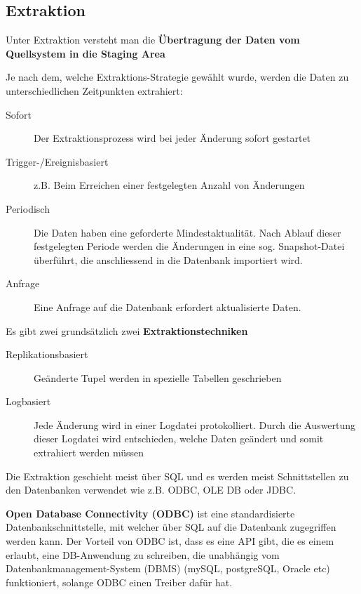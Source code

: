 \documentclass[a4paper, 11pt]{article}
\begin{document}
\subsection{Extraktion}

Unter Extraktion versteht man die \textbf{Übertragung der Daten vom Quellsystem in die Staging Area}

\vspace{10px}

\noindent Je nach dem, welche Extraktions-Strategie gewählt wurde, werden die Daten zu unterschiedlichen Zeitpunkten extrahiert:

\begin{description}
	\item[Sofort] Der Extraktionsprozess wird bei jeder Änderung sofort gestartet
	\item[Trigger-/Ereignisbasiert] z.B. Beim Erreichen einer festgelegten Anzahl von Änderungen
	\item[Periodisch] Die Daten haben eine geforderte Mindestaktualität. Nach Ablauf dieser festgelegten Periode werden die Änderungen in eine sog. Snapshot-Datei überführt, die anschliessend in die Datenbank importiert wird.
	\item[Anfrage] Eine Anfrage auf die Datenbank erfordert aktualisierte Daten.
\end{description}

\vspace{10px}

\noindent Es gibt zwei grundsätzlich zwei \textbf{Extraktionstechniken}
\begin{description}
	\item[Replikationsbasiert] Geänderte Tupel werden in spezielle Tabellen geschrieben
	\item[Logbasiert] Jede Änderung wird in einer Logdatei protokolliert. Durch die Auswertung dieser Logdatei wird entschieden, welche Daten geändert und somit extrahiert werden müssen
\end{description}

\noindent Die Extraktion geschieht meist über SQL und es werden meist Schnittstellen zu den Datenbanken verwendet wie z.B. ODBC, OLE DB oder JDBC.

\vspace{10px}

\noindent \textbf{Open Database Connectivity (ODBC)} ist eine standardisierte Datenbankschnittstelle, mit welcher über SQL auf die Datenbank zugegriffen werden kann. Der Vorteil von ODBC ist, dass es eine API gibt, die es einem erlaubt, eine DB-Anwendung zu schreiben, die unabhängig vom Datenbankmanagement-System (DBMS) (mySQL, postgreSQL, Oracle etc) funktioniert, solange ODBC einen Treiber dafür hat.
\end{document}
